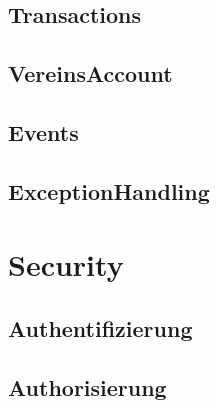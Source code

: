 \documentclass[a4paper, 11pt]{article}
\begin{document}


\subsection{Transactions}


\subsection{VereinsAccount}

\subsection{Events}



\subsection{ExceptionHandling}

\section{Security}

\subsection{Authentifizierung}

\subsection{Authorisierung}
\end{document}
